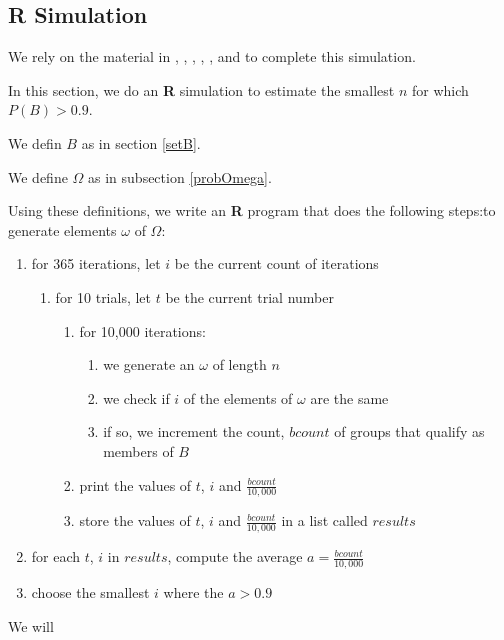 \documentclass[a4paper,11pt]{article}
\begin{document}
\subsection{\textbf{\textsf{R}} Simulation}

We rely on the material in \cite{stackCheckEltsEq}, \cite{rtut1A},
\cite{rtut1B}, \cite{stackConvertBoolInt}, \cite{QuickR}, and \cite{RDummies} 
to complete this simulation.

In this section, we do an \textbf{\textsf{R}} simulation to estimate the
smallest $n$ for which $P\left( B \right) > 0.9$.

We defin $B$ as in section \ref{setB}.

We define $\Omega$ as in subsection \ref{probOmega}.

Using these definitions, we write an \textbf{\textsf{R}} program that 
does the following steps:to generate elements $\omega$ of
$\Omega$:{}
\begin{enumerate}
  \item for 365 iterations, let $i$ be the current count of iterations
  \begin{enumerate}
    \item for 10 trials, let $t$ be the current trial number
    \begin{enumerate}
      \item for 10,000 iterations:
      \begin{enumerate}
        \item we generate an $\omega$ of length $n$
        \item we check if $i$ of the elements of $\omega$ are the same
        \item if so, we increment the count, $bcount$ of groups that qualify as members of $B$
      \end{enumerate}
      \item print the values of $t$, $i$ and $\frac{bcount}{10,000}$
      \item store the values of $t$, $i$ and $\frac{bcount}{10,000}$ in a list called $results$
    \end{enumerate}
  \end{enumerate}
  \item for each $t$, $i$ in $results$, compute the average $a = \frac{bcount}{10,000}$ 
  \item choose the smallest $i$ where the $a > 0.9$
\end{enumerate}

We will  
\begin{lstlisting}

\end{lstlisting}
\printbibliography
\end{document}
